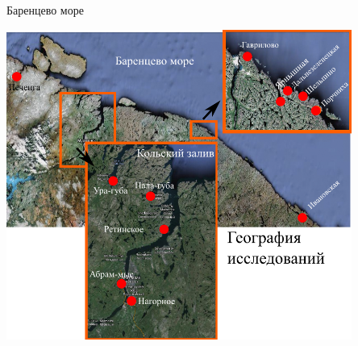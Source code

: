 \documentclass{beamer}
\begin{document}
\begin{frame}{Баренцево море}
 \begin{center}
	\includegraphics[width=0.85\textwidth]{./Murman_google.png}
 \end{center}
\end{frame}

%
%
%

%
\end{document}
